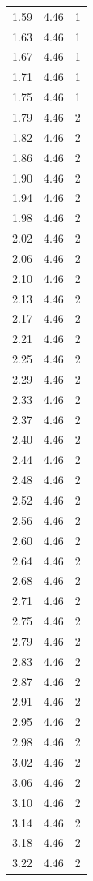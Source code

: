 \begin{longtable}{lrr}
  1.59 & 4.46 & 1 \\
  1.63 & 4.46 & 1 \\
  1.67 & 4.46 & 1 \\
  1.71 & 4.46 & 1 \\
  1.75 & 4.46 & 1 \\
  1.79 & 4.46 & 2 \\
  1.82 & 4.46 & 2 \\
  1.86 & 4.46 & 2 \\
  1.90 & 4.46 & 2 \\
  1.94 & 4.46 & 2 \\
  1.98 & 4.46 & 2 \\
  2.02 & 4.46 & 2 \\
  2.06 & 4.46 & 2 \\
  2.10 & 4.46 & 2 \\
  2.13 & 4.46 & 2 \\
  2.17 & 4.46 & 2 \\
  2.21 & 4.46 & 2 \\
  2.25 & 4.46 & 2 \\
  2.29 & 4.46 & 2 \\
  2.33 & 4.46 & 2 \\
  2.37 & 4.46 & 2 \\
  2.40 & 4.46 & 2 \\
  2.44 & 4.46 & 2 \\
  2.48 & 4.46 & 2 \\
  2.52 & 4.46 & 2 \\
  2.56 & 4.46 & 2 \\
  2.60 & 4.46 & 2 \\
  2.64 & 4.46 & 2 \\
  2.68 & 4.46 & 2 \\
  2.71 & 4.46 & 2 \\
  2.75 & 4.46 & 2 \\
  2.79 & 4.46 & 2 \\
  2.83 & 4.46 & 2 \\
  2.87 & 4.46 & 2 \\
  2.91 & 4.46 & 2 \\
  2.95 & 4.46 & 2 \\
  2.98 & 4.46 & 2 \\
  3.02 & 4.46 & 2 \\
  3.06 & 4.46 & 2 \\
  3.10 & 4.46 & 2 \\
  3.14 & 4.46 & 2 \\
  3.18 & 4.46 & 2 \\
  3.22 & 4.46 & 2 \\

\end{longtable}
